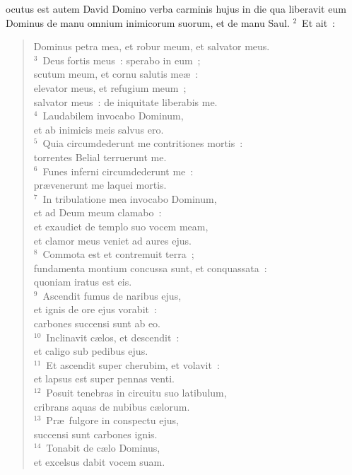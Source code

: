 \bchapter
{}ocutus est autem David Domino verba carminis hujus in die qua liberavit eum Dominus de manu omnium inimicorum suorum, et de manu Saul.
${}^{2}$~Et ait~: \begin{verse}Dominus petra mea, et robur meum, et salvator meus.\\
${}^{3}$~Deus fortis meus~: sperabo in eum~;\\ scutum meum, et cornu salutis me\ae~:\\ elevator meus, et refugium meum~;\\ salvator meus~: de iniquitate liberabis me.\\
${}^{4}$~Laudabilem invocabo Dominum,\\ et ab inimicis meis salvus ero.\\
${}^{5}$~Quia circumdederunt me contritiones mortis~:\\ torrentes Belial terruerunt me.\\
${}^{6}$~Funes inferni circumdederunt me~:\\ pr\ae venerunt me laquei mortis.\\
${}^{7}$~In tribulatione mea invocabo Dominum,\\ et ad Deum meum clamabo~:\\ et exaudiet de templo suo vocem meam,\\ et clamor meus veniet ad aures ejus.\\
${}^{8}$~Commota est et contremuit terra~;\\ fundamenta montium concussa sunt, et conquassata~:\\ quoniam iratus est eis.\\
${}^{9}$~Ascendit fumus de naribus ejus,\\ et ignis de ore ejus vorabit~:\\ carbones succensi sunt ab eo.\\
${}^{10}$~Inclinavit c\ae los, et descendit~:\\ et caligo sub pedibus ejus.\\
${}^{11}$~Et ascendit super cherubim, et volavit~:\\ et lapsus est super pennas venti.\\
${}^{12}$~Posuit tenebras in circuitu suo latibulum,\\ cribrans aquas de nubibus c\ae lorum.\\
${}^{13}$~Pr\ae\ fulgore in conspectu ejus,\\ succensi sunt carbones ignis.\\
${}^{14}$~Tonabit de c\ae lo Dominus,\\ et excelsus dabit vocem suam.\\

\end{verse}
